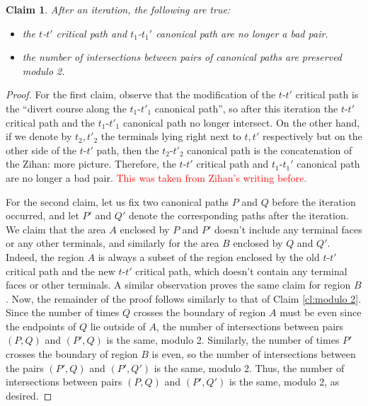 \documentclass[11pt]{article}
\newcommand{\zihan}[1]{{\color{blue} Zihan: #1}}
\newtheorem{claim}[theorem]{Claim}
\begin{document}
\begin{claim}
    After an iteration, the following are true:
    \begin{itemize}
        \item the $t$-$t'$ critical path and $t_1$-$t_1'$ canonical path are no longer a bad pair. 
        \item the number of intersections between pairs of canonical paths are preserved modulo 2.
    \end{itemize} \label{cl:monotone and modulo 2}
\end{claim}
\begin{proof}
    For the first claim, observe that the modification of the $t$-$t'$ critical path is the ``divert course along the $t_1$-$t'_1$ canonical path'', so after this iteration the $t$-$t'$ critical path and the $t_1$-$t'_1$ canonical path no longer intersect. On the other hand, if we denote by $t_2,t'_2$ the terminals lying right next to $t,t'$ respectively but on the other side of the $t$-$t'$ path, then the $t_2$-$t'_2$ canonical path is the concatenation of the \zihan{more picture.} Therefore, the $t$-$t'$ critical path and $t_1$-$t_1'$ canonical path are no longer a bad pair. \textcolor{red}{This was taken from Zihan's writing before.}

    For the second claim, let us fix two canonical paths $P$ and $Q$ before the iteration occurred, and let $P'$ and $Q'$ denote the corresponding paths after the iteration. We claim that the area $A$ enclosed by $P$ and $P'$ doesn't include any terminal faces or any other terminals, and similarly for the area $B$ enclosed by $Q$ and $Q'$. Indeed, the region $A$ is always a subset of the region enclosed by the old $t$-$t'$ critical path and the new $t$-$t'$ critical path, which doesn't contain any terminal faces or other terminals. A similar observation proves the same claim for region $B$. Now, the remainder of the proof follows similarly to that of Claim \ref{cl:modulo 2}. Since the number of times $Q$ crosses the boundary of region $A$ must be even since the endpoints of $Q$ lie outside of $A$, the number of intersections between pairs $(P,Q)$ and $(P',Q)$ is the same, modulo 2. Similarly, the number of times $P'$ crosses the boundary of region $B$ is even, so the number of intersections between the pairs $(P',Q)$ and $(P',Q')$ is the same, modulo 2. Thus, the number of intersections between pairs $(P,Q)$ and $(P',Q')$ is the same, modulo 2, as desired. 
\end{proof}
\fi

\end{document}
